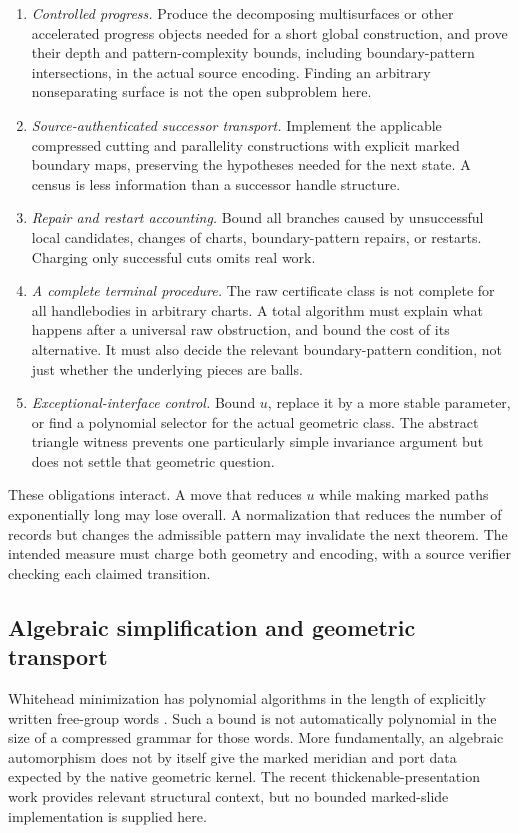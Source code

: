 \begin{enumerate}
\item \emph{Controlled progress.}  Produce the decomposing multisurfaces
or other accelerated progress objects needed for a short global
construction, and prove their depth and pattern-complexity bounds,
including boundary-pattern intersections, in the actual source encoding.
Finding an arbitrary nonseparating surface is not the open
subproblem here.
\item \emph{Source-authenticated successor transport.}  Implement the
applicable compressed cutting and parallelity constructions with explicit
marked boundary maps, preserving the hypotheses needed for the next
state.  A census is less information than a successor handle structure.
\item \emph{Repair and restart accounting.}  Bound all branches caused
by unsuccessful local candidates, changes of charts, boundary-pattern
repairs, or restarts.  Charging only successful cuts omits real work.
\item \emph{A complete terminal procedure.}  The raw certificate class
is not complete for all handlebodies in arbitrary charts.  A total
algorithm must explain what happens after a universal raw obstruction,
and bound the cost of its alternative.  It must also decide the relevant
boundary-pattern condition, not just whether the underlying pieces are
balls.
\item \emph{Exceptional-interface control.}  Bound $u$, replace it by a
more stable parameter, or find a polynomial selector for the actual
geometric class.  The abstract triangle witness prevents one particularly
simple invariance argument but does not settle that geometric question.
\end{enumerate}

These obligations interact.  A move that reduces $u$ while making marked
paths exponentially long may lose overall.  A normalization that reduces
the number of records but changes the admissible pattern may invalidate
the next theorem.  The intended measure must charge both geometry and
encoding, with a source verifier checking each claimed transition.

\subsection{Algebraic simplification and geometric transport}

Whitehead minimization has polynomial algorithms in the length of
explicitly written free-group words \cite{RoigVenturaWeil}.  Such a bound
is not automatically polynomial in the size of a compressed grammar for
those words.  More fundamentally, an algebraic automorphism does not by
itself give the marked meridian and port data expected by the native
geometric kernel.  The recent thickenable-presentation work
\cite{LackenbyStable2026} provides relevant structural context, but no
bounded marked-slide implementation is supplied here.

